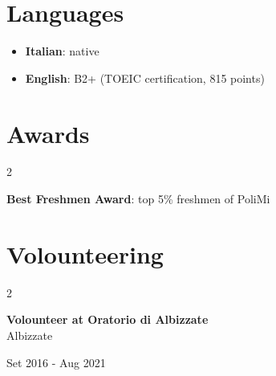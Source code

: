 \documentclass[10pt, letterpaper]{article}
\newenvironment{highlights}{
    \begin{itemize}[
        topsep=0.10 cm,
        parsep=0.10 cm,
        partopsep=0pt,
        itemsep=0pt,
        leftmargin=0.4 cm + 10pt
    ]
}{
    \end{itemize}
} %
\newenvironment{twocolentry}[2][]{
    \onecolentry
    \def\secondColumn{#2}
    \setcolumnwidth{\fill, 4.5 cm}
    \begin{paracol}{2}
}{
    \switchcolumn \raggedleft \secondColumn
    \end{paracol}
    \endonecolentry
} %
\begin{document}
\section{\mbox{{\color{black}\footnotesize\faGlobeAmericas}\hspace*{0.13cm}Languages}}

\begin{highlights}
    \item \textbf{Italian}: native
    \item \textbf{English}: B2+ (TOEIC certification, 815 points)
\end{highlights}

\section{\mbox{{\color{black}\footnotesize\faTrophy}\hspace*{0.13cm}Awards}}
        \begin{twocolentry}{2023}
            \textbf{Best Freshmen Award}: top 5\% freshmen of PoliMi
        \end{twocolentry}

    \section{\mbox{{\color{black}\footnotesize\faSeedling}\hspace*{0.13cm}Volounteering}}
            
        \begin{twocolentry}{Set 2016 - Aug 2021}
        \textbf{Volounteer at Oratorio di Albizzate}\\
        Albizzate
        \end{twocolentry}
\end{document}
